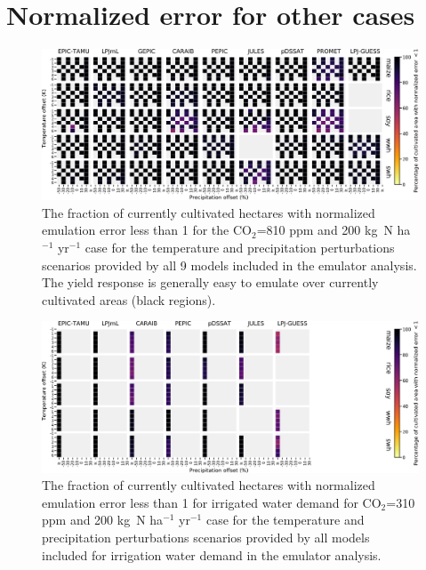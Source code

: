 \documentclass[10pt]{article}
\begin{document}
{{%

\clearpage
\section{Normalized error for other cases}

\begin{figure}[h!]
  \centering
  \includegraphics[width=15.5cm]{error_grid_810.png}
  \caption{
  The fraction of currently cultivated hectares with normalized emulation error less than 1 for the CO$_2$=810 ppm and 200 kg~N ha$^{-1}$ yr$^{-1}$ case for the temperature and precipitation perturbations scenarios provided by all 9 models included in the emulator analysis. 
  The yield response is generally easy to emulate over currently cultivated areas (black regions).
  }
  \label{fig:error810}
\end{figure}

\begin{figure}[h!]
  \centering
  \includegraphics[width=15.5cm]{error_grid_360_cultivated_IWD.png}
  \caption{
  The fraction of currently cultivated hectares with normalized emulation error less than 1 for irrigated water demand for CO$_2$=310 ppm and 200 kg~N ha$^{-1}$ yr$^{-1}$ case for the temperature and precipitation perturbations scenarios provided by all models included for irrigation water demand in the emulator analysis. 
  }
  \label{fig:error810}
\end{figure}

}}
\end{document}
